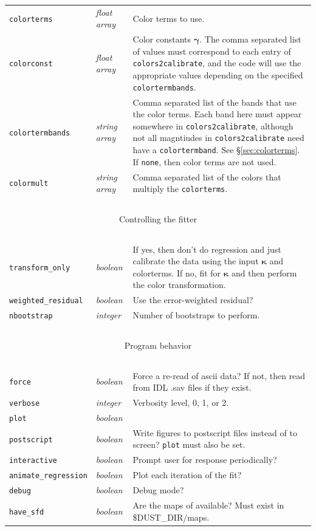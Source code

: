 \documentclass{report}
\newcommand{\zptcolor}{\boldsymbol{\kappa}}
\newcommand{\colorconst}{\boldsymbol{\gamma}}
\begin{document}
\begin{center}
\begin{longtable}{llp{3.5in}}
\verb|colorterms| & {\it float array} & Color terms to use. \\
\verb|colorconst| & {\it float array} & Color constants $\colorconst$. The comma separated list of values must correspond to each entry of \verb|colors2calibrate|, and the code will use the appropriate values depending on the specified \verb|colortermbands|. \\
\verb|colortermbands| & {\it string array} & Comma separated list of the bands that use the color terms. Each band here must appear somewhere in \verb|colors2calibrate|, although not all magntiudes in \verb|colors2calibrate| need have a \verb|colortermband|.  See \S\ref{sec:colorterms}.  If {\tt none}, then color terms are not used. \\
\verb|colormult| & {\it string array} & Comma separated list of the colors that multiply the \verb|colorterms|. \\

~ & ~ & ~ \\ \hline
\multicolumn{3}{c}{Controlling the fitter} \\
\hline ~ & ~ & ~ \\ 

\verb|transform_only| & {\it boolean} & If yes, then don't do regression and just calibrate the data using the input $\zptcolor$ and colorterms.  If no, fit for $\zptcolor$ and then perform the color transformation. \\
\verb|weighted_residual| & {\it boolean} & Use the error-weighted residual? \\
\verb|nbootstrap| & {\it integer} & Number of bootstraps to perform. \\

~ & ~ & ~ \\ \hline
\multicolumn{3}{c}{Program behavior} \\
\hline ~ & ~ & ~ \\ 

\verb|force| & {\it boolean} & Force a re-read of ascii data? If not, then read from IDL .sav files if they exist.  \\
\verb|verbose| & {\it integer} & Verbosity level, 0, 1, or 2.  \\
\verb|plot| & {\it boolean} &  \\
\verb|postscript| & {\it boolean} & Write figures to postscript files instead of to screen? \verb|plot| must also be set.  \\
\verb|interactive| & {\it boolean} & Prompt user for response periodically? \\
\verb|animate_regression| & {\it boolean} & Plot each iteration of the fit? \\
\verb|debug| & {\it boolean} & Debug mode? \\
\verb|have_sfd| & {\it boolean} & Are the maps of \citet{bib:sfd} available? Must exist in \$DUST\_DIR/maps. \\



\end{longtable}
\end{center}
\end{document}
